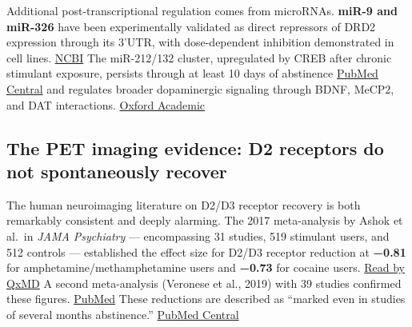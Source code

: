 Additional post-transcriptional regulation comes from microRNAs. \textbf{miR-9 and miR-326} have been experimentally validated as direct repressors of DRD2 expression through its 3'UTR, with dose-dependent inhibition demonstrated in cell lines. \href{https://ncbi.nlm.nih.gov/pmc/articles/PMC4036351}{NCBI} The miR-212/132 cluster, upregulated by CREB after chronic stimulant exposure, persists through at least 10 days of abstinence \href{https://pmc.ncbi.nlm.nih.gov/articles/PMC5355523/}{PubMed Central} and regulates broader dopaminergic signaling through BDNF, MeCP2, and DAT interactions. \href{https://academic.oup.com/nar/article/40/11/4742/2409307}{Oxford Academic}

\subsection{The PET imaging evidence: D2 receptors do not spontaneously recover}\label{15_d2_downregulation-the-pet-imaging-evidence-d2-receptors-do-not-spontaneously-recover}

The human neuroimaging literature on D2/D3 receptor recovery is both remarkably consistent and deeply alarming. The 2017 meta-analysis by Ashok et al.~in \emph{JAMA Psychiatry} --- encompassing 31 studies, 519 stimulant users, and 512 controls --- established the effect size for D2/D3 receptor reduction at \textbf{−0.81} for amphetamine/methamphetamine users and \textbf{−0.73} for cocaine users. \href{https://read.qxmd.com/read/28297025/association-of-stimulant-use-with-dopaminergic-alterations-in-users-of-cocaine-amphetamine-or-methamphetamine-a-systematic-review-and-meta-analysis?gs=0&token=Laq4UKKuST7oC3UyhuhD13oq2oUTSuOD4CBV4\%2BbKEM8MVPasrvyWNR1SzxjznoqbK91UlsvKce3kx4Qw5/vTPZBXu\%2BrfS/mGhuWkv49DmDtCtrzGp28FacfSqk\%2BuQUHkNkOVPKgZD3RtSfLXjlQ6yeAwtrHmqvGlbkHK5nhdEhOCBXx55iEat/SZJ\%2B5wSQTIdZNyqyUAbnse3E8iKQ1NE2vzA3j64ctif9Ji2CiVgLDIbkP8sCFFQoiZjbDvj9RVoOcU/gDgkOsCA5ToqACStEoG8Q6nYTgtFbiZKYYYWTzJAp4pEU9Rm//9unfXVN0xnuwjxWKN84/X3iqRo5toBlllLzacPgVge5oPQ\%2Bg2\%2B2Pvu7rX/HBO0AVszqlc0ResvYspDfj79\%2BB0/LDg06Wn1xiZOPSqMPGw8jmWx01LN/aImuSQNlRiIhwZObAU9GEe&redirected=slug}{Read by QxMD} A second meta-analysis (Veronese et al., 2019) with 39 studies confirmed these figures. \href{https://pubmed.ncbi.nlm.nih.gov/30981746/}{PubMed} These reductions are described as ``marked even in studies of several months abstinence.'' \href{https://pmc.ncbi.nlm.nih.gov/articles/PMC5419581/}{PubMed Central}

